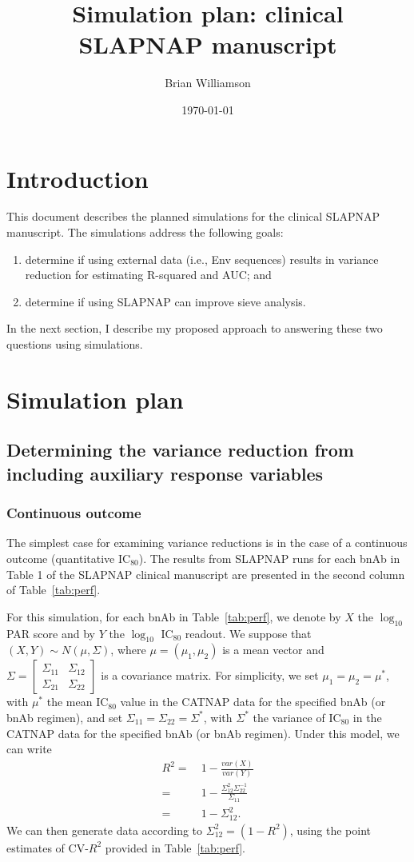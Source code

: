 \documentclass[10pt]{article}
\author{Brian Williamson}
\title{Simulation plan: clinical SLAPNAP manuscript}
\date{\today}
\begin{document}
\maketitle

\section{Introduction}

This document describes the planned simulations for the clinical SLAPNAP manuscript. The simulations address the following goals:
\begin{enumerate}
    \item determine if using external data (i.e., Env sequences) results in variance reduction for estimating R-squared and AUC; and
    \item determine if using SLAPNAP can improve sieve analysis.
\end{enumerate}
In the next section, I describe my proposed approach to answering these two questions using simulations.

\section{Simulation plan}
\subsection{Determining the variance reduction from including auxiliary response variables}
\subsubsection{Continuous outcome}
The simplest case for examining variance reductions is in the case of a continuous outcome (quantitative IC$_{80}$). The results from SLAPNAP runs for each bnAb in Table 1 of the SLAPNAP clinical manuscript are presented in the second column of Table~\ref{tab:perf}.

For this simulation, for each bnAb in Table~\ref{tab:perf}, we denote by $X$ the $\log_{10}$ PAR score and by $Y$ the $\log_{10}$ IC$_{80}$ readout. We suppose that $(X,Y) \sim N(\mu, \Sigma)$, where $\mu = (\mu_1, \mu_2)$ is a mean vector and $\Sigma = \begin{bmatrix} \Sigma_{11} & \Sigma_{12} \\ \Sigma_{21} & \Sigma_22 \end{bmatrix}$ is a covariance matrix. For simplicity, we set $\mu_1 = \mu_2 = \mu^*$, with $\mu^*$ the mean IC$_{80}$ value in the CATNAP data for the specified bnAb (or bnAb regimen), and set $\Sigma_{11} = \Sigma_{22} = \Sigma^*$, with $\Sigma^*$ the variance of IC$_{80}$ in the CATNAP data for the specified bnAb (or bnAb regimen). Under this model, we can write
\begin{align*}
    R^2 =& \ 1 - \frac{var(X)}{var(Y)} \\
    =& \ 1 - \frac{\Sigma_{12}^2\Sigma_{22}^{-1}}{\Sigma_{11}} \\
    =& \ 1 - \Sigma_{12}^2.
\end{align*}
We can then generate data according to $\Sigma_{12}^2 = (1 - R^2)$, using the point estimates of CV-$R^2$ provided in Table~\ref{tab:perf}.
\end{document}
